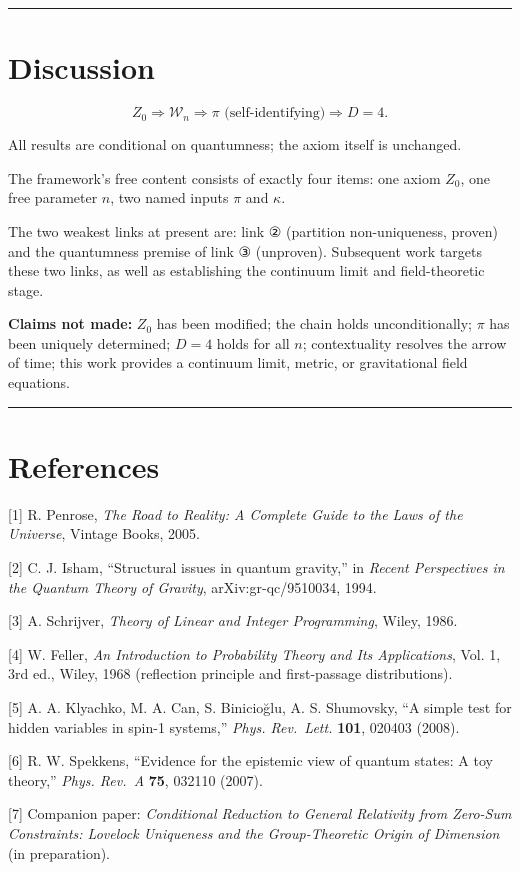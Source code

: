 \documentclass[
  11pt,
]{article}
\begin{document}
\begin{center}\rule{0.5\linewidth}{0.5pt}\end{center}

\section{Discussion}\label{discussion}

\[
Z_0 \Longrightarrow \mathcal{W}_n \Longrightarrow \pi \text{ (self-identifying)} \Longrightarrow D=4.
\]

All results are conditional on quantumness; the axiom itself is
unchanged.

The framework's free content consists of exactly four items: one axiom
\(Z_0\), one free parameter \(n\), two named inputs \(\pi\) and
\(\kappa\).

The two weakest links at present are: link ② (partition non-uniqueness,
proven) and the quantumness premise of link ③ (unproven). Subsequent
work targets these two links, as well as establishing the continuum
limit and field-theoretic stage.

\textbf{Claims not made:} \(Z_0\) has been modified; the chain holds
unconditionally; \(\pi\) has been uniquely determined; \(D=4\) holds for
all \(n\); contextuality resolves the arrow of time; this work provides
a continuum limit, metric, or gravitational field equations.

\begin{center}\rule{0.5\linewidth}{0.5pt}\end{center}

\section*{References}\label{references}

{[}1{]} R. Penrose, \emph{The Road to Reality: A Complete Guide to the
Laws of the Universe}, Vintage Books, 2005.

{[}2{]} C. J. Isham, ``Structural issues in quantum gravity,'' in
\emph{Recent Perspectives in the Quantum Theory of Gravity},
arXiv:gr-qc/9510034, 1994.

{[}3{]} A. Schrijver, \emph{Theory of Linear and Integer Programming},
Wiley, 1986.

{[}4{]} W. Feller, \emph{An Introduction to Probability Theory and Its
Applications}, Vol. 1, 3rd ed., Wiley, 1968 (reflection principle and
first-passage distributions).

{[}5{]} A. A. Klyachko, M. A. Can, S. Binicioğlu, A. S. Shumovsky, ``A
simple test for hidden variables in spin-1 systems,'' \emph{Phys.
Rev.~Lett.} \textbf{101}, 020403 (2008).

{[}6{]} R. W. Spekkens, ``Evidence for the epistemic view of quantum
states: A toy theory,'' \emph{Phys. Rev.~A} \textbf{75}, 032110 (2007).

{[}7{]} Companion paper: \emph{Conditional Reduction to General
Relativity from Zero-Sum Constraints: Lovelock Uniqueness and the
Group-Theoretic Origin of Dimension} (in preparation).
\end{document}
